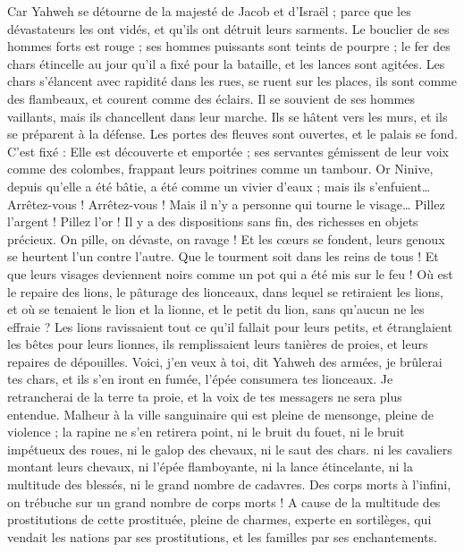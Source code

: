 \begin{multicols}{2}
Car Yahweh se détourne de la majesté de Jacob et d'Israël ; parce que les dévastateurs les ont vidés, et qu'ils ont détruit leurs sarments.
Le bouclier de ses hommes forts est rouge ; ses hommes puissants sont teints de pourpre ; le fer des chars étincelle au jour qu'il a fixé pour la bataille, et les lances sont agitées.
Les chars s'élancent avec rapidité dans les rues, se ruent sur les places, ils sont comme des flambeaux, et courent comme des éclairs.
Il se souvient de ses hommes vaillants, mais ils chancellent dans leur marche. Ils se hâtent vers les murs, et ils se préparent à la défense.
Les portes des fleuves sont ouvertes, et le palais se fond.
C'est fixé : Elle est découverte et emportée ; ses servantes gémissent de leur voix comme des colombes, frappant leurs poitrines comme un tambour.
Or Ninive, depuis qu'elle a été bâtie, a été comme un vivier d'eaux ; mais ils s'enfuient… Arrêtez-vous ! Arrêtez-vous ! Mais il n'y a personne qui tourne le visage…
Pillez l'argent ! Pillez l'or ! Il y a des dispositions sans fin, des richesses en objets précieux.
On pille, on dévaste, on ravage ! Et les cœurs se fondent, leurs genoux se heurtent l'un contre l'autre. Que le tourment soit dans les reins de tous ! Et que leurs visages deviennent noirs comme un pot qui a été mis sur le feu !
Où est le repaire des lions, le pâturage des lionceaux, dans lequel se retiraient les lions, et où se tenaient le lion et la lionne, et le petit du lion, sans qu'aucun ne les effraie ?
Les lions ravissaient tout ce qu'il fallait pour leurs petits, et étranglaient les bêtes pour leurs lionnes, ils remplissaient leurs tanières de proies, et leurs repaires de dépouilles.
Voici, j'en veux à toi, dit Yahweh des armées, je brûlerai tes chars, et ils s'en iront en fumée, l'épée consumera tes lionceaux. Je retrancherai de la terre ta proie, et la voix de tes messagers ne sera plus entendue.
\VerseOne{}Malheur à la ville sanguinaire qui est pleine de mensonge, pleine de violence ; la rapine ne s'en retirera point,
ni le bruit du fouet, ni le bruit impétueux des roues, ni le galop des chevaux, ni le saut des chars.
ni les cavaliers montant leurs chevaux, ni l'épée flamboyante, ni la lance étincelante, ni la multitude des blessés, ni le grand nombre de cadavres. Des corps morts à l'infini, on trébuche sur un grand nombre de corps morts !
A cause de la multitude des prostitutions de cette prostituée, pleine de charmes, experte en sortilèges, qui vendait les nations par ses prostitutions, et les familles par ses enchantements.

\end{multicols}
